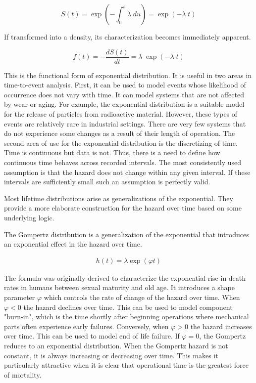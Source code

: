 $$ S(t) = \exp \left (- \int_0^t \lambda\; du  \right ) = \exp (- \lambda\; t )$$

If transformed into a density, its characterization becomes immediately apparent.

$$ f(t) = - \frac{d S(t)}{dt} = \lambda\; \exp(- \lambda\; t) $$

This is the functional form of exponential distribution. It is useful in two areas in time-to-event analysis. First, it can be used to model events whose likelihood of occurrence does not vary with time. It can model systems that are not affected by wear or aging. For example, the exponential distribution is a suitable model for the release of particles from radioactive material\cite{Jowett1958}. However, these types of events are relatively rare in industrial settings. There are very few systems that do not experience some changes as a result of their length of operation. The second area of use for the exponential distribution is the discretizing of time. Time is continuous but data is not. Thus, there is a need to define how continuous time behaves across recorded intervals. The most consistently used assumption is that the hazard does not change within any given interval. If these intervals are sufficiently small such an assumption is perfectly valid.

Most lifetime distributions arise as generalizations of the exponential. They provide a more elaborate construction for the hazard over time based on some underlying logic.

The Gompertz distribution is a generalization of the exponential that introduces an exponential effect in the hazard over time.

\begin{align*}
h(t) = \lambda \exp(\varphi t) \tag{ $\lambda > 0, \varphi \in (-\infty, \infty) $}
\end{align*}

The formula was originally derived to characterize the exponential rise in death rates in humans between sexual maturity and old age\cite{Wienke2010}. It introduces a shape parameter $\varphi$ which controls the rate of change of the hazard over time. When $\varphi < 0$ the hazard declines over time. This can be used to model component "burn-in", which is the time shortly after beginning operations where mechanical parts often experience early failures. Conversely, when $\varphi > 0$ the hazard increases over time. This can be used to model end of life failure. If $\varphi = 0$, the Gompertz reduces to an exponential distribution. When the Gompertz hazard is not constant, it is always increasing or decreasing over time. This makes it particularly attractive when it is clear that operational time is the greatest force of mortality.

